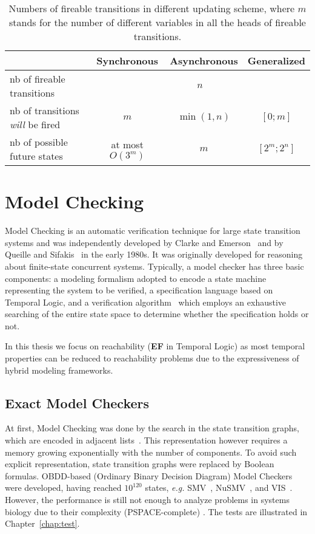 \begin{table}[ht]
    \centering
    \small
    \begin{tabular}{l|c|c|c}
        &Synchronous&Asynchronous&Generalized\\
        \hline
        nb of fireable transitions&\multicolumn{3}{c}{$n$}\\
        \hline
        nb of transitions \textit{will} be fired&$m$&$\min(1,n)$&$[0;m]$\\
        \hline
        nb of possible future states& at most $O(3^m)$&$m$&$[2^m;2^n]$
    \end{tabular}
    \caption[Update schemes]{Numbers of fireable transitions %
    in different updating scheme, where $m$ stands for the number of different variables in all the heads of fireable transitions.}
    \label{tab:semantics}
\end{table}

\section{Model Checking}\label{sec:modelchecking}
Model Checking is an automatic verification technique for large state transition systems and was independently developed by Clarke and Emerson~\cite{clarke1981design} and by Queille and Sifakis~\cite{queille1982specification} in the early 1980s. It was originally developed for reasoning about finite-state concurrent systems.
Typically, a model checker has three basic components: a modeling formalism adopted to encode a state machine representing the system to be verified, a specification language based on Temporal Logic, and a verification algorithm~\cite{clarke20142} which employs an exhaustive searching of the entire state space to determine whether the specification holds or not.

In this thesis we focus on reachability (\textbf{EF} in Temporal Logic) as most temporal properties can be reduced to reachability problems due to the expressiveness of hybrid modeling frameworks.

\subsection{Exact Model Checkers}
At first, Model Checking was done by the search in the state transition graphs, which are encoded in adjacent lists~\cite{clarke1981design}.
This representation however requires a memory growing exponentially with the number of components.
To avoid such explicit representation, state transition graphs were replaced by Boolean formulas.
OBDD-based (Ordinary Binary Decision Diagram) Model Checkers were developed, having reached $10^{120}$ states, \textit{e.g.}
SMV~\cite{mcmillan1993symbolic}, NuSMV~\cite{cimatti2000nusmv}, and VIS~\cite{brayton1996vis}.
However, the performance is still not enough to analyze problems in systems biology due to their complexity (PSPACE-complete) \cite{harel2002complexity}.
The tests are illustrated in Chapter~\ref{chap:test}.  

